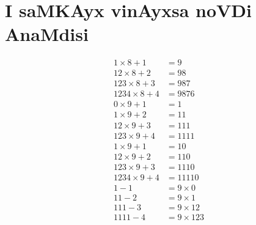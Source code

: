 \chapter{I saMKAyx vinAyxsa noVDi AnaMdisi}

\begin{align*}
1\times 8 + 1 &= 9\\
12 \times 8 + 2 &= 98\\
123 \times 8 + 3 &= 987\\
1234 \times 8 + 4 &= 9876\\[0.5cm]
0\times 9+1 &= 1\\          %
1\times 9+ 2 &= 11\\
12 \times 9 + 3 &= 111\\
123 \times 9 + 4 &=1111\\[0.5cm]
1\times 9 +1 &= 10\\ %
12\times 9 +2 &= 110\\
123 \times 9 + 3 &= 1110\\
1234 \times 9 +4 &= 11110\\[0.5cm]
1-1 &= 9 \times 0\\ %
11-2 &= 9 \times 1 \\
111 - 3 &= 9 \times 12\\
1111-4 &= 9 \times 123\\
\end{align*}


